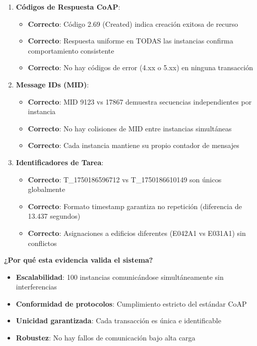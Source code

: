 \begin{enumerate}
    \item \textbf{Códigos de Respuesta CoAP}:
    \begin{itemize}
        \item \textcolor{successgreen}{\textbf{Correcto}}: Código 2.69 (Created) indica creación exitosa de recurso
        \item \textcolor{successgreen}{\textbf{Correcto}}: Respuesta uniforme en TODAS las instancias confirma comportamiento consistente
        \item \textcolor{successgreen}{\textbf{Correcto}}: No hay códigos de error (4.xx o 5.xx) en ninguna transacción
    \end{itemize}
    
    \item \textbf{Message IDs (MID)}:
    \begin{itemize}
        \item \textcolor{successgreen}{\textbf{Correcto}}: MID 9123 vs 17867 demuestra secuencias independientes por instancia
        \item \textcolor{successgreen}{\textbf{Correcto}}: No hay colisiones de MID entre instancias simultáneas
        \item \textcolor{successgreen}{\textbf{Correcto}}: Cada instancia mantiene su propio contador de mensajes
    \end{itemize}
    
    \item \textbf{Identificadores de Tarea}:
    \begin{itemize}
        \item \textcolor{successgreen}{\textbf{Correcto}}: T\_1750186596712 vs T\_1750186610149 son únicos globalmente
        \item \textcolor{successgreen}{\textbf{Correcto}}: Formato timestamp garantiza no repetición (diferencia de 13.437 segundos)
        \item \textcolor{successgreen}{\textbf{Correcto}}: Asignaciones a edificios diferentes (E042A1 vs E031A1) sin conflictos
    \end{itemize}
\end{enumerate}

\textbf{¿Por qué esta evidencia valida el sistema?}
\begin{itemize}
    \item \textbf{Escalabilidad}: 100 instancias comunicándose simultáneamente sin interferencias
    \item \textbf{Conformidad de protocolos}: Cumplimiento estricto del estándar CoAP
    \item \textbf{Unicidad garantizada}: Cada transacción es única e identificable
    \item \textbf{Robustez}: No hay fallos de comunicación bajo alta carga
\end{itemize}

